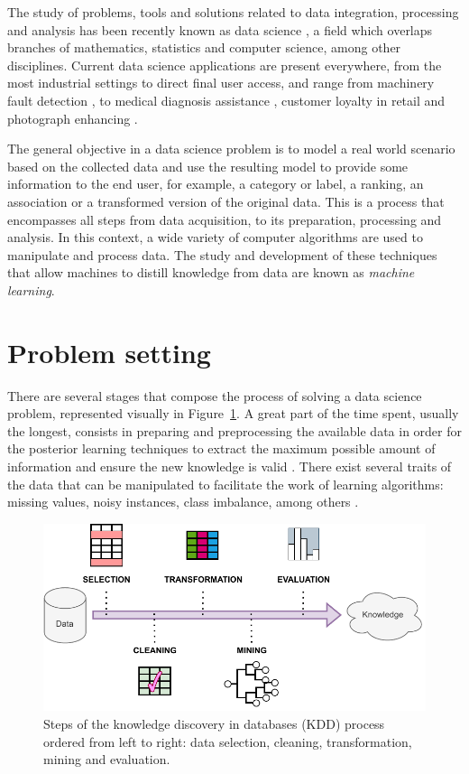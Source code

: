 The study of problems, tools and solutions related to data integration, processing and analysis has been recently known as data science , a field which overlaps branches of mathematics, statistics and computer science, among other disciplines. Current data science applications are present everywhere, from the most industrial settings to direct final user access, and range from machinery fault detection , to medical diagnosis assistance , customer loyalty in retail  and photograph enhancing .
\fi 

The general objective in a data science problem is to model a real world scenario based on the collected data and use the resulting model to provide some information to the end user, for example, a category or label, a ranking, an association or a transformed version of the original data. This is a process that encompasses all steps from data acquisition, to its preparation, processing and analysis. In this context, a wide variety of computer algorithms are used to manipulate and process data. The study and development of these techniques that allow machines to distill knowledge from data are known as \textit{machine learning}.

\section{Problem setting}

There are several stages that compose the process of solving a data science problem, represented visually in Figure~\ref{fig:kdd}. A great part of the time spent, usually the longest, consists in preparing and preprocessing the available data in order for the posterior learning techniques to extract the maximum possible amount of information and ensure the new knowledge is valid . There exist several traits of the data that can be manipulated to facilitate the work of learning algorithms: missing values, noisy instances, class imbalance, among others .

\begin{figure}
    \includegraphics[width=\linewidth]{images/kddprocess.pdf}
    \caption{\label{fig:kdd}Steps of the knowledge discovery in databases (KDD) process ordered from left to right: data selection, cleaning, transformation, mining and evaluation.}
\end{figure}

